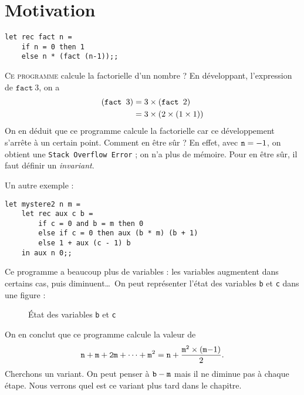 \section{Motivation}

\begin{lstlisting}[language=caml, caption=Calcul de factorielle]
let rec fact n =
	if n = 0 then 1
	else n * (fact (n-1));;
\end{lstlisting}

\lettrine{C}{e programme} calcule la factorielle d'un nombre ? En développant, l'expression de $\texttt{fact}\ 3$, on a
\begin{align*}
	(\text{\tt fact } 3) &= 3 \times (\text{\tt fact } 2) \\
	&= 3 \times (2 \times (1 \times 1)) \\
\end{align*}
On en déduit que ce programme calcule la factorielle car ce développement s'arrête à un certain point. Comment en être sûr ? En effet, avec $\text{\tt n} = -1$, on obtient une {\tt Stack Overflow Error} ; on n'a plus de mémoire.
Pour en être sûr, il faut définir un {\it invariant}.


Un autre exemple : 

\begin{lstlisting}[language=caml, caption=Un programme mystère (2)]
let mystere2 n m =
	let rec aux c b =
		if c = 0 and b = m then 0
		else if c = 0 then aux (b * m) (b + 1)
		else 1 + aux (c - 1) b
	in aux n 0;;
\end{lstlisting}

Ce programme a beaucoup plus de variables : les variables augmentent dans certains cas, puis diminuent\ldots\ On peut représenter l'état des variables {\tt b} et {\tt c} dans une figure :

\begin{figure}[H]
	\centering
	\caption{État des variables {\tt b} et {\tt c}}
\end{figure}

On en conclut que ce programme calcule la valeur de \[
	\tt n + m + 2m + \cdots + m^{\rm 2} = n + \frac{m^2\times (m{\rm -1})}{\rm 2}
.\]
Cherchons un variant. On peut penser à $\tt b - m$\/ mais il ne diminue pas à chaque étape. Nous verrons quel est ce variant plus tard dans le chapitre.

